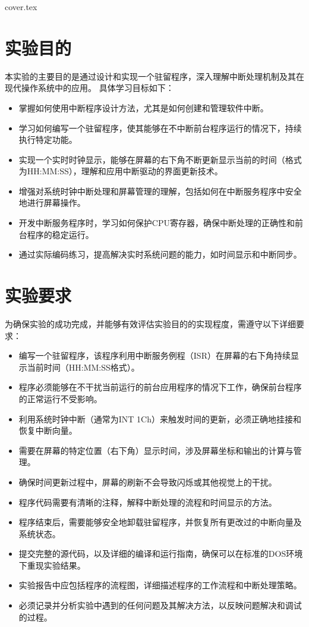\documentclass[12pt]{article}
\begin{document}
 {cover.tex}
\section{实验目的}
本实验的主要目的是通过设计和实现一个驻留程序，深入理解中断处理机制及其在现代操作系统中的应用。
具体学习目标如下：

\begin{itemize}
    \item 掌握如何使用中断程序设计方法，尤其是如何创建和管理软件中断。
    \item 学习如何编写一个驻留程序，使其能够在不中断前台程序运行的情况下，持续执行特定功能。
    \item 实现一个实时时钟显示，能够在屏幕的右下角不断更新显示当前的时间（格式为HH:MM:SS），理解和应用中断驱动的界面更新技术。
    \item 增强对系统时钟中断处理和屏幕管理的理解，包括如何在中断服务程序中安全地进行屏幕操作。
    \item 开发中断服务程序时，学习如何保护CPU寄存器，确保中断处理的正确性和前台程序的稳定运行。
    \item 通过实际编码练习，提高解决实时系统问题的能力，如时间显示和中断同步。
\end{itemize}

\section{实验要求}
为确保实验的成功完成，并能够有效评估实验目的的实现程度，需遵守以下详细要求：
\begin{itemize}
    \item 编写一个驻留程序，该程序利用中断服务例程（ISR）在屏幕的右下角持续显示当前时间（HH:MM:SS格式）。
    \item 程序必须能够在不干扰当前运行的前台应用程序的情况下工作，确保前台程序的正常运行不受影响。
    \item 利用系统时钟中断（通常为INT 1Ch）来触发时间的更新，必须正确地挂接和恢复中断向量。
    \item 需要在屏幕的特定位置（右下角）显示时间，涉及屏幕坐标和输出的计算与管理。
    \item 确保时间更新过程中，屏幕的刷新不会导致闪烁或其他视觉上的干扰。
    \item 程序代码需要有清晰的注释，解释中断处理的流程和时间显示的方法。
    \item 程序结束后，需要能够安全地卸载驻留程序，并恢复所有更改过的中断向量及系统状态。
    \item 提交完整的源代码，以及详细的编译和运行指南，确保可以在标准的DOS环境下重现实验结果。
    \item 实验报告中应包括程序的流程图，详细描述程序的工作流程和中断处理策略。
    \item 必须记录并分析实验中遇到的任何问题及其解决方法，以反映问题解决和调试的过程。
\end{itemize}
\end{document}
